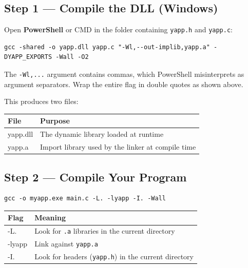 \documentclass[11pt, a4paper]{article}
\newcommand{\file}[1]{\texttt{#1}}
\begin{document}
\subsection{Step 1 — Compile the DLL (Windows)}

Open \textbf{PowerShell} or CMD in the folder containing \file{yapp.h} and \file{yapp.c}:

\begin{tcolorbox}[codebox]
\begin{lstlisting}[style=shellstyle, numbers=none]
gcc -shared -o yapp.dll yapp.c "-Wl,--out-implib,yapp.a" -DYAPP_EXPORTS -Wall -O2
\end{lstlisting}
\end{tcolorbox}

\begin{tcolorbox}[warningbox]
The \texttt{-Wl,...} argument contains commas, which PowerShell misinterprets as argument
separators. Wrap the entire flag in double quotes as shown above.
\end{tcolorbox}

This produces two files:

\begin{center}
\begin{tabular}{>{\ttfamily}l l}
\toprule
\normalfont\textbf{File} & \textbf{Purpose} \\
\midrule
yapp.dll & The dynamic library loaded at runtime \\
yapp.a   & Import library used by the linker at compile time \\
\bottomrule
\end{tabular}
\end{center}

\subsection{Step 2 — Compile Your Program}

\begin{tcolorbox}[codebox]
\begin{lstlisting}[style=shellstyle, numbers=none]
gcc -o myapp.exe main.c -L. -lyapp -I. -Wall
\end{lstlisting}
\end{tcolorbox}

\begin{center}
\begin{tabular}{>{\ttfamily}l l}
\toprule
\normalfont\textbf{Flag} & \textbf{Meaning} \\
\midrule
-L.      & Look for \texttt{.a} libraries in the current directory \\
-lyapp   & Link against \texttt{yapp.a} \\
-I.      & Look for headers (\texttt{yapp.h}) in the current directory \\
\bottomrule
\end{tabular}
\end{center}
\end{document}
